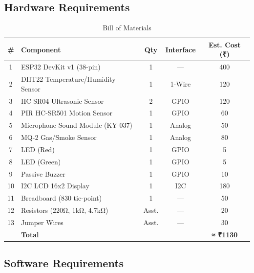 \documentclass[12pt,a4paper]{article}
\begin{document}
\newpage

\subsection{Hardware Requirements}

\begin{table}[H]
\centering
\caption{Bill of Materials}
\begin{tabularx}{\textwidth}{c X c c c}
\toprule
\textbf{\#} & \textbf{Component} & \textbf{Qty} & \textbf{Interface} & \textbf{Est. Cost (₹)} \\
\midrule
1  & ESP32 DevKit v1 (38-pin)         & 1 & —         & 400 \\
2  & DHT22 Temperature/Humidity Sensor & 1 & 1-Wire    & 120 \\
3  & HC-SR04 Ultrasonic Sensor         & 2 & GPIO      & 120 \\
4  & PIR HC-SR501 Motion Sensor        & 1 & GPIO      & 60  \\
5  & Microphone Sound Module (KY-037)  & 1 & Analog    & 50  \\
6  & MQ-2 Gas/Smoke Sensor             & 1 & Analog    & 80  \\
7  & LED (Red)                         & 1 & GPIO      & 5   \\
8  & LED (Green)                       & 1 & GPIO      & 5   \\
9  & Passive Buzzer                    & 1 & GPIO      & 10  \\
10 & I2C LCD 16x2 Display              & 1 & I2C       & 180 \\
11 & Breadboard (830 tie-point)        & 1 & —         & 50  \\
12 & Resistors (220Ω, 1kΩ, 4.7kΩ)     & Asst. & —    & 20  \\
13 & Jumper Wires                      & Asst. & —     & 30  \\
\midrule
   & \textbf{Total}                    & & & \textbf{≈ ₹1130} \\
\bottomrule
\end{tabularx}
\end{table}

\subsection{Software Requirements}
\end{document}
